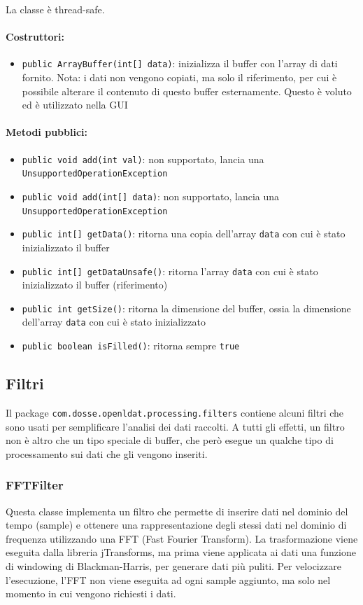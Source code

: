 La classe è thread-safe.

\paragraph{Costruttori:}\begin{itemize}
	\item \texttt{public ArrayBuffer(int[] data)}: inizializza il buffer con l'array di dati fornito. Nota: i dati non vengono copiati, ma solo il riferimento, per cui è possibile alterare il contenuto di questo buffer esternamente. Questo è voluto ed è utilizzato nella GUI
\end{itemize}

\paragraph{Metodi pubblici:}\begin{itemize}
	\item \texttt{public void add(int val)}: non supportato, lancia una \texttt{UnsupportedOperationException}
	\item \texttt{public void add(int[] data)}: non supportato, lancia una \texttt{UnsupportedOperationException}
	\item \texttt{public int[] getData()}: ritorna una copia dell'array \texttt{data} con cui è stato inizializzato il buffer
	\item \texttt{public int[] getDataUnsafe()}: ritorna l'array \texttt{data} con cui è stato inizializzato il buffer (riferimento)
	\item \texttt{public int getSize()}: ritorna la dimensione del buffer, ossia la dimensione dell'array \texttt{data} con cui è stato inizializzato
	\item \texttt{public boolean isFilled()}: ritorna sempre \texttt{true}
\end{itemize}

\subsection{Filtri}
Il package \texttt{com.dosse.openldat.processing.filters} contiene alcuni filtri che sono usati per semplificare l'analisi dei dati raccolti. A tutti gli effetti, un filtro non è altro che un tipo speciale di buffer, che però esegue un qualche tipo di processamento sui dati che gli vengono inseriti.

\subsubsection{FFTFilter}
Questa classe implementa un filtro che permette di inserire dati nel dominio del tempo (sample) e ottenere una rappresentazione degli stessi dati nel dominio di frequenza utilizzando una FFT (Fast Fourier Transform). La trasformazione viene eseguita dalla libreria jTransforms, ma prima viene applicata ai dati una funzione di windowing di Blackman-Harris, per generare dati più puliti. Per velocizzare l'esecuzione, l'FFT non viene eseguita ad ogni sample aggiunto, ma solo nel momento in cui vengono richiesti i dati.

